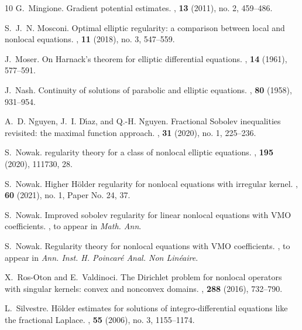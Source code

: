 \documentclass[11pt]{amsart}
\theoremstyle{plain}
\theoremstyle{definition}
\numberwithin{equation}{section}
\begin{document}
\begin{thebibliography}{10}
G.~Mingione.
\newblock Gradient potential estimates.
, \textbf{13} (2011), no. 2, 459--486.

S.~J.~N. Mosconi.
\newblock Optimal elliptic regularity: a comparison between local and nonlocal
  equations.
, \textbf{11} (2018), no. 3, 547--559.

J.~Moser.
\newblock On {H}arnack's theorem for elliptic differential equations.
, \textbf{14} (1961), 577--591.

J.~Nash.
\newblock Continuity of solutions of parabolic and elliptic equations.
, \textbf{80} (1958), 931--954.

A.~D. Nguyen, J.~I. D\'{\i}az, and Q.-H. Nguyen.
\newblock Fractional {S}obolev inequalities revisited: the maximal function
  approach.
,
  \textbf{31} (2020), no. 1, 225--236.

S.~Nowak.
 regularity theory for a class of nonlocal elliptic
  equations.
, \textbf{195} (2020), 111730, 28.

S.~Nowak.
\newblock Higher {H}\"{o}lder regularity for nonlocal equations with irregular
  kernel.
, \textbf{60} (2021), no. 1, Paper No. 24,
  37.

S.~Nowak.
\newblock Improved sobolev regularity for linear nonlocal equations with {VMO}
  coefficients.
,
\newblock to appear in \textit{Math. Ann}.

S.~Nowak.
\newblock Regularity theory for nonlocal equations with {VMO} coefficients.
,
\newblock to appear in \textit{Ann. Inst. H. Poincar\'{e} Anal. Non Lin\'{e}aire}.

X.~Ros-Oton and E.~Valdinoci.
\newblock The {D}irichlet problem for nonlocal operators with singular kernels:
  convex and nonconvex domains.
, \textbf{288} (2016), 732--790.

L.~Silvestre.
\newblock H\"{o}lder estimates for solutions of integro-differential equations
  like the fractional {L}aplace.
, \textbf{55} (2006), no. 3, 1155--1174.


\end{thebibliography}
\end{document}
